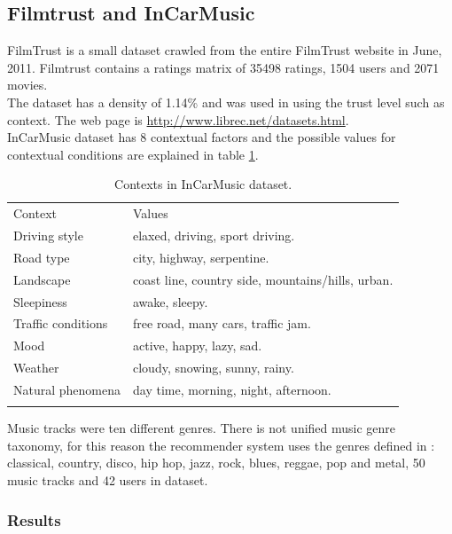 \subsection{Filmtrust and InCarMusic} 
FilmTrust is a small dataset crawled from the entire FilmTrust website
in June, 2011. Filmtrust contains a ratings matrix of 35498 ratings,
1504  users and 2071 movies. \\ The dataset has a density of 1.14\% and
was used in \cite{guo2013novel} using the trust level such as
context. The web page is \url{http://www.librec.net/datasets.html}.\\ 
InCarMusic dataset\cite{baltrunas2011incarmusic} has 8 
contextual factors and the possible values for contextual conditions 
are explained in table \ref{tab:incarmusic}.\\ 
\begin{table}
\centering
\small
\captionsetup{font=footnotesize}
\caption{Contexts in InCarMusic dataset.}
\label{tab:incarmusic}   
\begin{tabular}{ll}
\hline\noalign{\smallskip}
Context  			& Values \\
\noalign{\smallskip}\hline\noalign{\smallskip}
Driving style 		&  elaxed, driving, sport driving.   \\
Road type 			&  city, highway, serpentine. \\
Landscape 			& coast line, country side, mountains/hills, urban.\\
Sleepiness 			& awake, sleepy. \\
Traffic conditions 	& free road, many cars, traffic jam. \\
Mood 				& active, happy, lazy, sad. \\
Weather 			& cloudy, snowing, sunny, rainy. \\
Natural phenomena 	& day time, morning, night, afternoon. \\
\noalign{\smallskip}\hline
\end{tabular}
\end{table}
Music tracks were ten different genres. There is not unified music
genre taxonomy, for this reason the recommender system uses the genres
defined in \cite{tzanetakis2002musical}: classical, country, disco, 
hip hop, jazz, rock, blues, reggae, pop and metal, 50 music tracks 
and 42 users in dataset.

\subsubsection{Results} 

